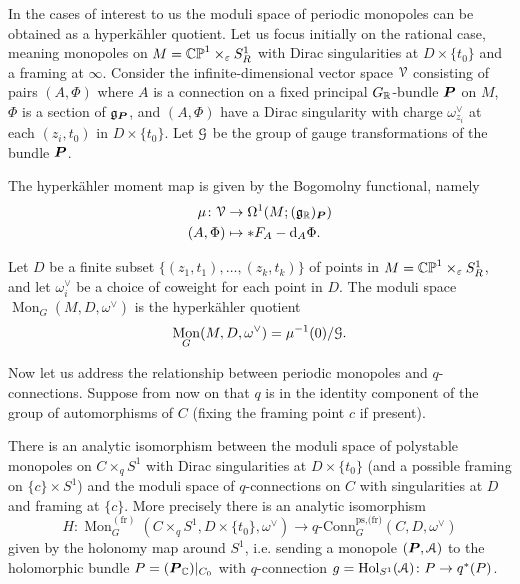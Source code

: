 \documentclass[10pt, oneside]{article}
\DeclareMathOperator{\mon}{Mon}
\newcommand{\qconn}{q\text{-Conn}}
\renewcommand{\d}{\mathrm{d}}
\newcommand{\fr}{\mathrm{fr}}
\DeclareMathOperator{\Hol}{Hol}
\begin{document}
In the cases of interest to us the moduli space of periodic monopoles can be obtained as a hyperk\"ahler quotient.  Let us focus initially on the rational case, meaning monopoles on $M = \mathbb{CP}^1 \times_\varepsilon S^1_R$ with Dirac singularities at $D \times \{t_0\}$ and a framing at $\infty$.  Consider the infinite-dimensional vector space $\mathcal{V}$ consisting of pairs $(A,\Phi)$ where $A$ is a connection on a fixed principal $G_{\mathbb{R}}$-bundle $\boldsymbol{P}$ on $M$, $\Phi$ is a section of $\mathfrak{g}_{\boldsymbol{P}}$, and $(A,\Phi)$ have a Dirac singularity with charge $\omega^\vee_{z_i}$ at each $(z_i,t_0)$ in $D \times \{t_0\}$.  Let $\mathcal{G}$ be the group of gauge transformations of the bundle $\boldsymbol{P}$.

The hyperk\"ahler moment map is given by the Bogomolny functional, namely
\begin{align*}
\mu \colon \mc V &\to \Omega^1(M; (\gg_\RR)_{\bo P}) \\
(A,\Phi) &\mapsto \ast F_A - \d_A \Phi.
\end{align*}

\begin{definition} \label{monopole_moduli_def}
Let $D$ be a finite subset $\{(z_1,t_1), \ldots, (z_k, t_k)\}$ of points in $M = \mathbb{CP}^1 \times_\varepsilon S^1_R$, and let $\omega^\vee_{i}$ be a choice of coweight for each point in $D$. The moduli space $\mon_G(M, D, \omega^\vee)$ is the hyperk\"ahler quotient
\[\mon_G(M, D, \omega^\vee) = \mu^{-1}(0) / \mc G.\]
\end{definition}

Now let us address the relationship between periodic monopoles and $q$-connections.  Suppose from now on that $q$ is in the identity component of the group of automorphisms of $C$ (fixing the framing point $c$ if present).

\begin{theorem} \label{monopole_qconn_comparison_thm}
There is an analytic isomorphism between the moduli space of polystable monopoles on $C \times_q S^1$ with Dirac singularities at $D \times \{t_0\}$ (and a possible framing on $\{c\} \times S^1$) and the moduli space of $q$-connections on $C$ with singularities at $D$ and framing at $\{c\}$.  More precisely there is an analytic isomorphism
\[H \colon \mon^{(\fr)}_G(C \times_q S^1, D \times \{t_0\}, \omega^\vee) \to \qconn_G^{\text{ps,(fr)}}(C, D, \omega^\vee)\]
given by the holonomy map around $S^1$, i.e. sending a monopole $(\boldsymbol{P}, \mathcal{A})$ to the holomorphic bundle $P = (\boldsymbol{P}_{\mathbb{C}})|_{C_0}$ with $q$-connection $g = \Hol_{S^1}(\mc A) \colon P \to q^*(P)$.
\end{theorem}
\end{document}
